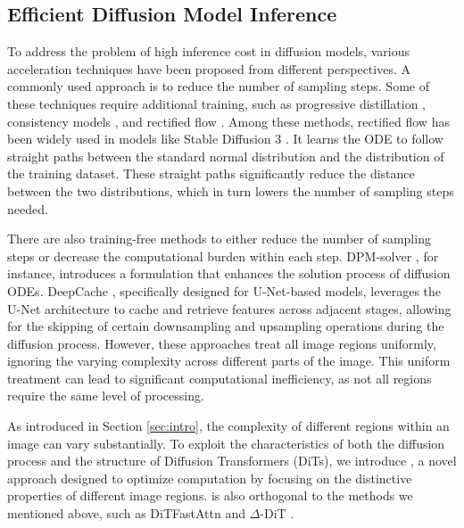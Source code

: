 \subsection{Efficient Diffusion Model Inference}
To address the problem of high inference cost in diffusion models, various acceleration techniques have been proposed from different perspectives. A commonly used approach is to reduce the number of sampling steps. Some of these techniques require additional training, such as progressive distillation \cite{salimansprogressive}, consistency models \cite{song2023consistency}, and rectified flow \cite{liu2022flow, lipman2022flow, albergo2022building}. 
Among these methods, rectified flow has been widely used in models like Stable Diffusion 3 \cite{esser2024scalingrectifiedflowtransformers}. It learns the ODE to follow straight paths between the standard normal distribution and the distribution of the training dataset. These straight paths significantly reduce the distance between the two distributions, which in turn lowers the number of sampling steps needed.

There are also training-free methods to either reduce the number of sampling steps or decrease the computational burden within each step. DPM-solver \cite{lu2022dpm}, for instance, introduces a formulation that enhances the solution process of diffusion ODEs. DeepCache \cite{xu2018deepcache}, specifically designed for U-Net-based models, leverages the U-Net architecture to cache and retrieve features across adjacent stages, allowing for the skipping of certain downsampling and upsampling operations during the diffusion process. However, these approaches treat all image regions uniformly, ignoring the varying complexity across different parts of the image. This uniform treatment can lead to significant computational inefficiency, as not all regions require the same level of processing.

As introduced in Section \ref{sec:intro}, the complexity of different regions within an image can vary substantially. 
To exploit the characteristics of both the diffusion process and the structure of Diffusion Transformers (DiTs), we introduce \ourmethod{}, a novel approach designed to optimize computation by focusing on the distinctive properties of different image regions. \ourmethod{} is also orthogonal to the methods we mentioned above, 
such as DiTFastAttn \cite{yuan2024ditfastattnattentioncompressiondiffusion} and $\Delta$-DiT \cite{chen2024delta}.
